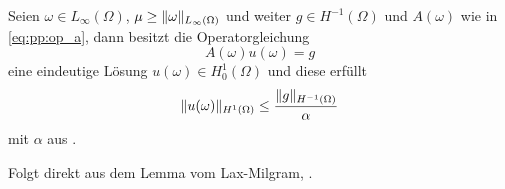 \begin{Satz}
\label{satz:pp:lax_auf_elliptisch}
    Seien $\omega \in L_{\infty}(\Omega)$, $\mu \geq \lVert\omega\rVert_{L_{\infty}(\Omega)}$ und weiter $g \in H^{-1}(\Omega)$ und $A(\omega)$ wie in \eqref{eq:pp:op_a}, dann besitzt die Operatorgleichung
    \begin{equation}
        A(\omega) u(\omega) = g
    \end{equation}
    eine eindeutige Lösung $u(\omega) \in H^{1}_{0}(\Omega)$ und diese erfüllt
    \begin{equation}
        \lVert u(\omega)\rVert_{H^{1}(\Omega)} \leq \frac{\lVert g\rVert_{H^{-1}(\Omega)}}{\alpha}
    \end{equation}
    mit $\alpha$ aus .

    \begin{Beweis}
        Folgt direkt aus dem Lemma vom Lax-Milgram, .
    \end{Beweis}
\end{Satz}



